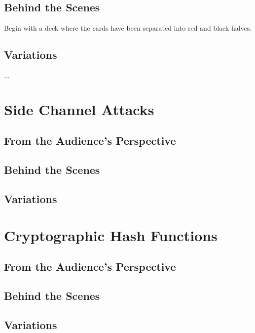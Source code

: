 \subsection{Behind the Scenes}

Begin with a deck where the cards have been separated into red and black halves.

\subsection{Variations}

...

\section{Side Channel Attacks}

\subsection{From the Audience's Perspective}

\subsection{Behind the Scenes}

\subsection{Variations}


\section{Cryptographic Hash Functions}

\subsection{From the Audience's Perspective}

\subsection{Behind the Scenes}

\subsection{Variations}
